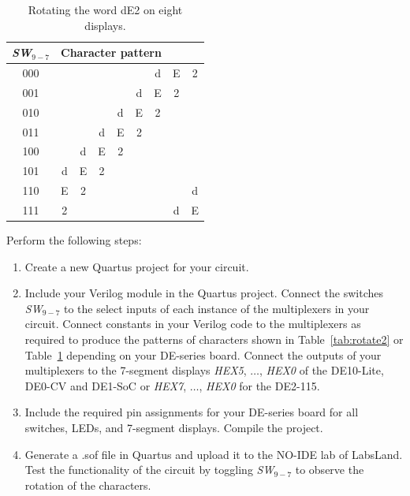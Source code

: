 \documentclass[epsfig,10pt,fullpage]{article}
\newcommand{\CommonDocsPath}{../../../common/docs}
\begin{document}
\begin{table}[ht]
\begin{minipage}[t]{12.5 cm}
\begin{center}
\begin{tabular}{c|cccccccc}
{\it SW}$_{9-7}$ & \multicolumn{6}{c}{Character pattern} \\
\hline
{\rule[0mm]{0mm}{5mm}000 } & & & & & & d & E & 2 \\ 
001 & & & & & d & E & 2 & \\
010 & & & & d & E & 2 & & \\
011 & & & d & E & 2 & & & \\
100 & & d & E & 2 & & & & \\
101 & d & E & 2 & & & & &  \\
110 & E & 2 & & & & & & d \\
111 & 2 & & & & & & d & E \\
\end{tabular}
\end{center}
\end{minipage}
\caption{Rotating the word dE2 on eight displays.}
\label{tab:rotate3}
\end{table}

Perform the following steps:
\begin{enumerate}
\item Create a new Quartus project for your circuit.
\item Include your Verilog module in the Quartus project. Connect the switches 
{\it SW}$_{9-7}$ to the select inputs of each instance of the 
multiplexers in your circuit. Connect constants in your Verilog code to the multiplexers 
as required to produce the patterns of characters shown in Table~\ref{tab:rotate2} or 
Table~\ref{tab:rotate3} depending on your DE-series board.
Connect the outputs of your multiplexers to the 7-segment displays {\it HEX5}, $\ldots$, 
{\it HEX0} of the DE10-Lite, DE0-CV and DE1-SoC or {\it HEX7}, $\ldots$, 
{\it HEX0} for the DE2-115.
\item Include the required pin assignments for your DE-series board for all switches, LEDs, 
and 7-segment displays. Compile the project.
\item Generate a .sof file in Quartus and upload it to the NO-IDE lab of LabsLand. Test the functionality of the 
circuit by toggling {\it SW}$_{9-7}$ to observe the rotation of the characters.
\end{enumerate}



\end{document}
